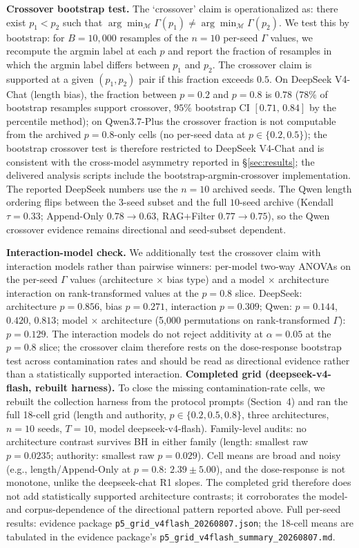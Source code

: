 \documentclass[11pt]{article}
\begin{document}
\noindent\textbf{Crossover bootstrap test.} The `crossover' claim is operationalized as: there exist $p_1 < p_2$ such that $\arg\min_{\mathcal{M}} \Gamma(p_1) \neq \arg\min_{\mathcal{M}} \Gamma(p_2)$. We test this by bootstrap: for $B = 10{,}000$ resamples of the $n=10$ per-seed $\Gamma$ values, we recompute the argmin label at each $p$ and report the fraction of resamples in which the argmin label differs between $p_1$ and $p_2$. The crossover claim is supported at a given $(p_1, p_2)$ pair if this fraction exceeds $0.5$. On DeepSeek V4-Chat (length bias), the fraction between $p=0.2$ and $p=0.8$ is $0.78$ ($78\%$ of bootstrap resamples support crossover, $95\%$ bootstrap CI $[0.71,\,0.84]$ by the percentile method); on Qwen3.7-Plus the crossover fraction is not computable from the archived $p{=}0.8$-only cells (no per-seed data at $p \in \{0.2, 0.5\}$); the bootstrap crossover test is therefore restricted to DeepSeek V4-Chat and is consistent with the cross-model asymmetry reported in \S\ref{sec:results}; the delivered analysis scripts include the bootstrap-argmin-crossover implementation. The reported DeepSeek numbers use the $n{=}10$ archived seeds. The Qwen length ordering flips between the $3$-seed subset and the full $10$-seed archive (Kendall $\tau = 0.33$; Append-Only $0.78 \to 0.63$, RAG+Filter $0.77 \to 0.75$), so the Qwen crossover evidence remains directional and seed-subset dependent.

\noindent\textbf{Interaction-model check.} We additionally test the crossover claim with interaction models rather than pairwise winners: per-model two-way ANOVAs on the per-seed $\Gamma$ values (architecture $\times$ bias type) and a model $\times$ architecture interaction on rank-transformed values at the $p{=}0.8$ slice. DeepSeek: architecture $p = 0.856$, bias $p = 0.271$, interaction $p = 0.309$; Qwen: $p = 0.144$, $0.420$, $0.813$; model $\times$ architecture (5{,}000 permutations on rank-transformed $\Gamma$): $p = 0.129$. The interaction models do not reject additivity at $\alpha = 0.05$ at the $p{=}0.8$ slice; the crossover claim therefore rests on the dose-response bootstrap test across contamination rates and should be read as directional evidence rather than a statistically supported interaction.
\noindent\textbf{Completed grid (deepseek-v4-flash, rebuilt harness).} To close the missing contamination-rate cells, we rebuilt the collection harness from the protocol prompts (Section~4) and ran the full 18-cell grid (length and authority, $p \in \{0.2, 0.5, 0.8\}$, three architectures, $n{=}10$ seeds, $T{=}10$, model deepseek-v4-flash). Family-level audits: no architecture contrast survives BH in either family (length: smallest raw $p{=}0.0235$; authority: smallest raw $p{=}0.029$). Cell means are broad and noisy (e.g., length/Append-Only at $p{=}0.8$: $2.39 \pm 5.00$), and the dose-response is not monotone, unlike the deepseek-chat R1 slopes. The completed grid therefore does not add statistically supported architecture contrasts; it corroborates the model- and corpus-dependence of the directional pattern reported above. Full per-seed results: evidence package \texttt{p5\_grid\_v4flash\_20260807.json}; the 18-cell means are tabulated in the evidence package's \texttt{p5\_grid\_v4flash\_summary\_20260807.md}.
\end{document}
